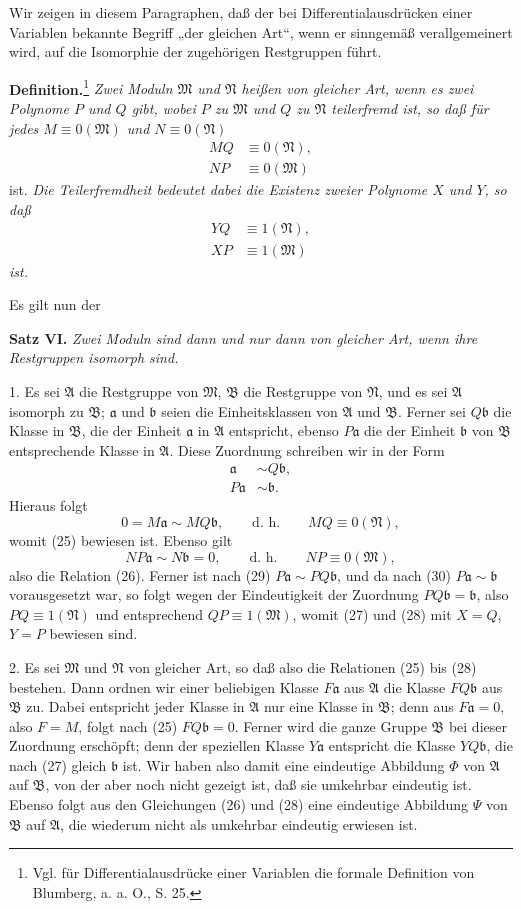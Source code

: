 \documentclass[11pt]{article}
\newcommand{\mM}{\mathfrak{M}}
\newcommand{\mN}{\mathfrak{N}}
\newcommand{\mA}{\mathfrak{A}}
\newcommand{\mB}{\mathfrak{B}}
\newcommand{\ma}{\mathfrak{a}}
\newcommand{\mb}{\mathfrak{b}}
\begin{document}
Wir zeigen in diesem Paragraphen, daß der bei Differentialausdrücken einer Variablen bekannte Begriff „der gleichen Art“, wenn er sinngemäß verallgemeinert wird, auf die Isomorphie der zugehörigen Restgruppen führt.

\textbf{Definition.}\footnote{Vgl. für Differentialausdrücke einer Variablen die formale Definition von Blumberg, a. a. O., S. 25.} \emph{Zwei Moduln $\mM$ und $\mN$ heißen von gleicher Art, wenn es zwei Polynome $P$ und $Q$ gibt, wobei $P$ zu $\mM$ und $Q$ zu $\mN$ teilerfremd ist, so daß für jedes $M\equiv0(\mM)$ und $N\equiv0(\mN)$}
\begin{align}
 MQ&\equiv0(\mN),\tag{25}\\
 NP&\equiv0(\mM)\tag{26}
\end{align}
ist. \emph{Die Teilerfremdheit bedeutet dabei die Existenz zweier Polynome $X$ und $Y$, so daß}
\begin{align}
 YQ&\equiv1(\mN),\tag{27}\\
 XP&\equiv1(\mM)\tag{28}
\end{align}
\emph{ist.}

Es gilt nun der

\textbf{Satz VI.} \emph{Zwei Moduln sind dann und nur dann von gleicher Art, wenn ihre Restgruppen isomorph sind.}

1. Es sei $\mA$ die Restgruppe von $\mM$, $\mB$ die Restgruppe von $\mN$, und es sei $\mA$ isomorph zu $\mB$; $\ma$ und $\mb$ seien die Einheitsklassen von $\mA$ und $\mB$. Ferner sei $Q\mb$ die Klasse in $\mB$, die der Einheit $\ma$ in $\mA$ entspricht, ebenso $P\ma$ die der Einheit $\mb$ von $\mB$ entsprechende Klasse in $\mA$. Diese Zuordnung schreiben wir in der Form
\begin{align}
 \ma&\sim Q\mb,\tag{29}\\
 P\ma&\sim\mb.\tag{30}
\end{align}
Hieraus folgt
\[
 0=M\ma\sim MQ\mb,
 \qquad\text{d. h.}\qquad MQ\equiv0(\mN),
\]
womit (25) bewiesen ist. Ebenso gilt
\[
 NP\ma\sim N\mb=0,
 \qquad\text{d. h.}\qquad NP\equiv0(\mM),
\]
also die Relation (26). Ferner ist nach (29) $P\ma\sim PQ\mb$, und da nach (30) $P\ma\sim\mb$ vorausgesetzt war, so folgt wegen der Eindeutigkeit der Zuordnung $PQ\mb=\mb$, also $PQ\equiv1(\mN)$ und entsprechend $QP\equiv1(\mM)$, womit (27) und (28) mit $X=Q$, $Y=P$ bewiesen sind.

2. Es sei $\mM$ und $\mN$ von gleicher Art, so daß also die Relationen (25) bis (28) bestehen. Dann ordnen wir einer beliebigen Klasse $F\ma$ aus $\mA$ die Klasse $FQ\mb$ aus $\mB$ zu. Dabei entspricht jeder Klasse in $\mA$ nur eine Klasse in $\mB$; denn aus $F\ma=0$, also $F=M$, folgt nach (25) $FQ\mb=0$. Ferner wird die ganze Gruppe $\mB$ bei dieser Zuordnung erschöpft; denn der speziellen Klasse $Y\ma$ entspricht die Klasse $YQ\mb$, die nach (27) gleich $\mb$ ist. Wir haben also damit eine eindeutige Abbildung $\Phi$ von $\mA$ auf $\mB$, von der aber noch nicht gezeigt ist, daß sie umkehrbar eindeutig ist. Ebenso folgt aus den Gleichungen (26) und (28) eine eindeutige Abbildung $\Psi$ von $\mB$ auf $\mA$, die wiederum nicht als umkehrbar eindeutig erwiesen ist.
\end{document}
